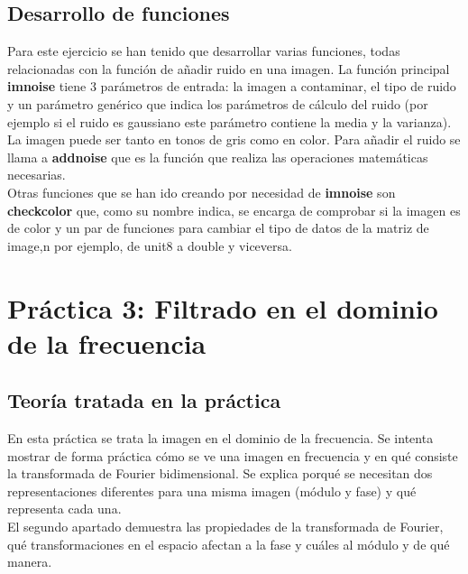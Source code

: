 \documentclass[a4paper,12pt]{report}
\begin{document}
\subsection{Desarrollo de funciones}

Para este ejercicio se han tenido que desarrollar varias funciones, todas relacionadas con la función de añadir ruido en una imagen. La función principal \textbf{imnoise} tiene 3 parámetros de entrada: la imagen a contaminar, el tipo de ruido y un parámetro genérico que indica los parámetros de cálculo del ruido (por ejemplo si el ruido es gaussiano este parámetro contiene la media y la varianza). La imagen puede ser tanto en tonos de gris como en color. Para añadir el ruido se llama a \textbf{addnoise} que es la función que realiza las operaciones matemáticas necesarias.\\

Otras funciones que se han ido creando por necesidad de \textbf{imnoise} son \textbf{checkcolor} que, como su nombre indica, se encarga de comprobar si la imagen es de color y un par de funciones para cambiar el tipo de datos de la matriz de image,n por ejemplo, de unit8 a double y viceversa.

\section{Práctica 3: Filtrado en el dominio de la frecuencia}
\subsection{Teoría tratada en la práctica}

En esta práctica se trata la imagen en el dominio de la frecuencia. Se intenta mostrar de forma práctica cómo se ve una imagen en frecuencia y en qué consiste la transformada de Fourier bidimensional. Se explica porqué se necesitan dos representaciones diferentes para una misma imagen (módulo y fase) y qué representa cada una.\\

El segundo apartado demuestra las propiedades de la transformada de Fourier, qué transformaciones en el espacio afectan a la fase y cuáles al módulo y de qué manera.\\
\end{document}
